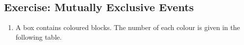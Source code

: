             \subsection{Exercise: Mutually Exclusive Events }
            \nopagebreak
            \label{m39377*id114930}\begin{enumerate}[noitemsep, label=\textbf{\arabic*}. ] 
            \label{m39377*uid79}\item A box contains coloured blocks. The number of each colour is given in
the following table.
    \setlength\mytablespace{10\tabcolsep}
    \addtolength\mytablespace{6\arrayrulewidth}
    \setlength\mytablewidth{\linewidth}
    \setlength\mytableroom{\mytablewidth}
    \addtolength\mytableroom{-\mytablespace}
    \setlength\myfixedwidth{0pt}
    \setlength\mystarwidth{\mytableroom}
        \addtolength\mystarwidth{-\myfixedwidth}
        \divide{}
\end{enumerate}
